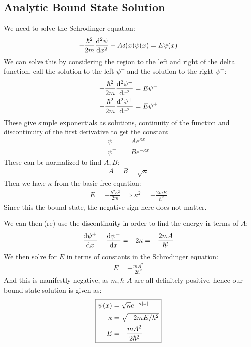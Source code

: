 \documentclass[12pt]{article}
\begin{document}
\subsection{Analytic Bound State Solution}
We need to solve the Schrodinger equation:
\begin{align*}
  -\frac{\hbar^2}{2m}\dv[2]{\psi}{x}-A\delta(x)\psi(x)=E\psi(x)
\end{align*}
We can solve this by considering the region to the left and right of the delta function, call the solution to the left $\psi^-$ and the solution to the right $\psi^+$:
\begin{align*}
  -\frac{\hbar^2}{2m}\dv[2]{\psi^-}{x}&=E\psi^-\\
  -\frac{\hbar^2}{2m}\dv[2]{\psi^+}{x}&=E\psi^+
\end{align*}
These give simple exponentials as solutions, continuity of the function and discontinuity of the first derivative to get the constant
\begin{align*}
  \psi^-&=Ae^{\kappa x}\\
  \psi^+&=Be^{-\kappa x}
\end{align*}
These can be normalized to find $A,B$:
\begin{align*}
  A=B=\sqrt{\kappa}
\end{align*}
Then we have $\kappa$ from the basic free equation:
\begin{align*}
  E=-\frac{\hbar^2\kappa^2}{2m}\implies\kappa^2=-\frac{2mE}{\hbar^2}
\end{align*}
Since this the bound state, the negative sign here does not matter.

We can then (re)-use the discontinuity in order to find the energy in terms of $A$:
\begin{align*}
  \dv{\psi^+}{x}-\dv{\psi^-}{x}=-2\kappa=-\frac{2mA}{\hbar^2}
\end{align*}
We then solve for $E$ in terms of constants in the Schrodinger equation:
\begin{align*}
  E=-\frac{mA^2}{2\hbar^2}
\end{align*}
And this is manifestly negative, as $m,\hbar,A$ are all definitely positive, hence our bound state solution is given as:
\begin{align}
  \boxed{\begin{aligned}
      \psi(x)&=\sqrt{\kappa}e^{-\kappa\abs{x}}\\
      \kappa&=\sqrt{-2mE/\hbar^2}\\
      E&=-\frac{mA^2}{2\hbar^2}
    \end{aligned}}
\end{align}
\end{document}
